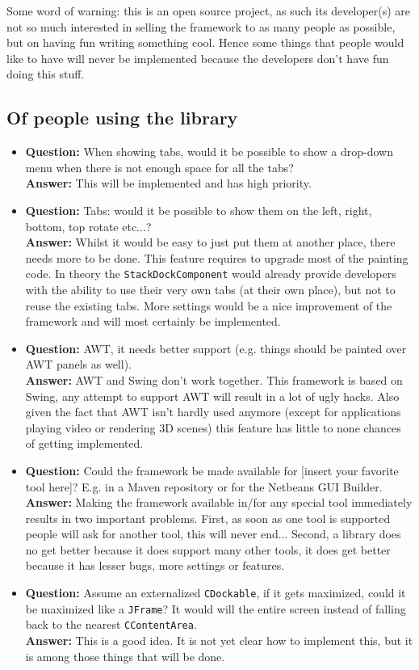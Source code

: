 \documentclass[a4paper,10pt]{article}
\newcommand{\src}[1]{\texttt{#1}}
\newcommand{\qa}[2]{\item \textbf{Question:} #1 \\ \textbf{Answer:} #2}
\begin{document}
Some word of warning: this is an open source project, as such its developer(s) are not so much interested in selling the framework to as many people as possible, but on having fun writing something cool. Hence some things that people would like to have will never be implemented because the developers don't have fun doing this stuff. 

\subsection{Of people using the library}

\begin{itemize}
 \qa{When showing tabs, would it be possible to show a drop-down menu when there is not enough space for all the tabs?}{This will be implemented and has high priority.}
 
 \qa{Tabs: would it be possible to show them on the left, right, bottom, top rotate etc...?}{Whilst it would be easy to just put them at another place, there needs more to be done. This feature requires to upgrade most of the painting code. In theory the \src{StackDockComponent} would already provide developers with the ability to use their very own tabs (at their own place), but not to reuse the existing tabs. More settings would be a nice improvement of the framework and will most certainly be implemented.}
 
 \qa{AWT, it needs better support (e.g. things should be painted over AWT panels as well).}{AWT and Swing don't work together. This framework is based on Swing, any attempt to support AWT will result in a lot of ugly hacks. Also given the fact that AWT isn't hardly used anymore (except for applications playing video or rendering 3D scenes) this feature has little to none chances of getting implemented.}
 
  \qa{Could the framework be made available for [insert your favorite tool here]? E.g. in a Maven repository or for the Netbeans GUI Builder.}{Making the framework available in/for any special tool immediately results in two important problems. First, as soon as one tool is supported people will ask for another tool, this will never end... Second, a library does no get better because it does support many other tools, it does get better because it has lesser bugs, more settings or features.}
 
 \qa{Assume an externalized \src{CDockable}, if it gets maximized, could it be maximized like a \src{JFrame}? It would will the entire screen instead of falling back to the nearest \src{CContentArea}.}{This is a good idea. It is not yet clear how to implement this, but it is among those things that will be done.}
 
\end{itemize}
\end{document}
